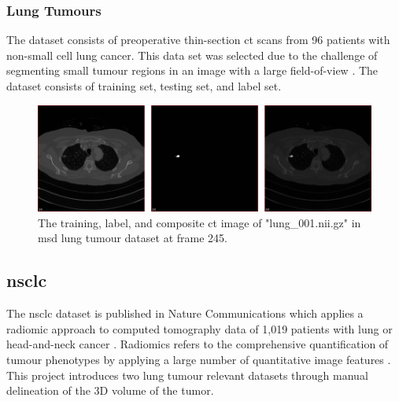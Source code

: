 \documentclass[11pt,times,oneside,openright]{eeereport}
\begin{document}
\subsubsection{Lung Tumours}
The dataset consists of preoperative thin-section \acrshort{ct} scans from
96 patients with non-small cell lung cancer. This data set was selected due to the challenge of segmenting small tumour regions in an image with a large field-of-view \cite{antonelli2021medical}. The dataset consists of training set, testing set, and label set.


\begin{figure}[h]
    \centering
    \includegraphics[width=\textwidth]{fig/msd_example.png}
    \caption{The training, label, and composite \acrshort{ct} image of "lung\_001.nii.gz" in \acrshort{msd} lung tumour dataset at frame 245.}
    \label{fig:msd_example}
\end{figure}

\subsection{\acrlong{nsclc}}

The \acrfull{nsclc} dataset is published in Nature Communications which applies a radiomic approach to computed tomography data of 1,019 patients with lung or head-and-neck cancer \cite{aerts2014decoding}. Radiomics refers to the comprehensive quantification of tumour phenotypes by applying a large number of quantitative image features \cite{aerts2014decoding}. This project introduces two lung tumour relevant datasets through manual delineation of the 3D volume of the tumor.
\end{document}
